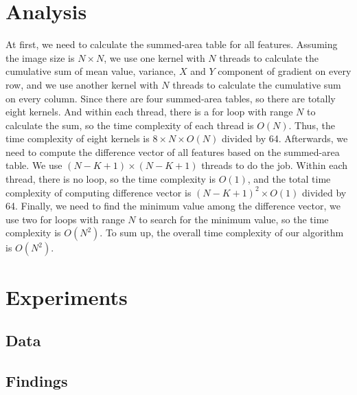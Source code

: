 \documentclass[12pt, a4paper]{article}
\begin{document}
\section{Analysis}
	At first, we need to calculate the summed-area table for all features. Assuming the image size is $N \times N$, we use one kernel with $N$ threads to calculate the cumulative sum of mean value, variance, $X$ and $Y$ component of gradient on every row, and we use another kernel with $N$ threads to calculate the cumulative sum on every column. Since there are four summed-area tables, so there are totally eight kernels. And within each thread, there is a for loop with range $N$ to calculate the sum, so the time complexity of each thread is $O(N)$. Thus, the time complexity of eight kernels is $8 \times N \times O(N)$ divided by 64. Afterwards, we need to compute the difference vector of all features based on the summed-area table. We use $(N - K + 1) \times (N - K + 1)$ threads to do the job. Within each thread, there is no loop, so the time complexity is $O(1)$, and the total time complexity of computing difference vector is $(N - K + 1) ^ 2 \times O(1)$ divided by 64. Finally, we need to find the minimum value among the difference vector, we use two for loops with range $N$ to search for the minimum value, so the time complexity is $O(N ^ 2)$. To sum up, the overall time complexity of our algorithm is $O(N ^ 2)$. 
\section{Experiments}
  \subsection{Data}
  \subsection{Findings}
\end{document}

